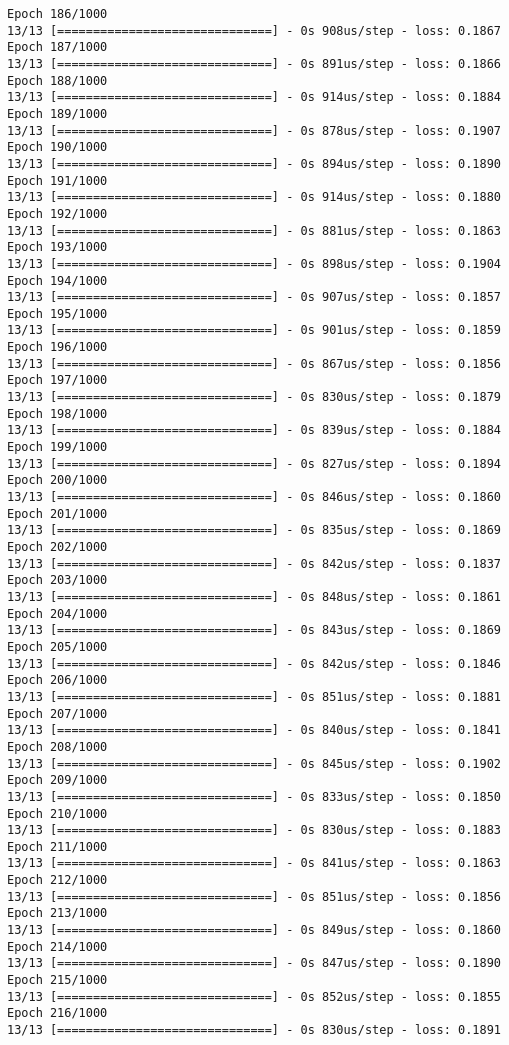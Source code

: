 \documentclass[11pt]{article}
\begin{document}
\begin{Verbatim}[commandchars=\\\{\}]
Epoch 186/1000
13/13 [==============================] - 0s 908us/step - loss: 0.1867
Epoch 187/1000
13/13 [==============================] - 0s 891us/step - loss: 0.1866
Epoch 188/1000
13/13 [==============================] - 0s 914us/step - loss: 0.1884
Epoch 189/1000
13/13 [==============================] - 0s 878us/step - loss: 0.1907
Epoch 190/1000
13/13 [==============================] - 0s 894us/step - loss: 0.1890
Epoch 191/1000
13/13 [==============================] - 0s 914us/step - loss: 0.1880
Epoch 192/1000
13/13 [==============================] - 0s 881us/step - loss: 0.1863
Epoch 193/1000
13/13 [==============================] - 0s 898us/step - loss: 0.1904
Epoch 194/1000
13/13 [==============================] - 0s 907us/step - loss: 0.1857
Epoch 195/1000
13/13 [==============================] - 0s 901us/step - loss: 0.1859
Epoch 196/1000
13/13 [==============================] - 0s 867us/step - loss: 0.1856
Epoch 197/1000
13/13 [==============================] - 0s 830us/step - loss: 0.1879
Epoch 198/1000
13/13 [==============================] - 0s 839us/step - loss: 0.1884
Epoch 199/1000
13/13 [==============================] - 0s 827us/step - loss: 0.1894
Epoch 200/1000
13/13 [==============================] - 0s 846us/step - loss: 0.1860
Epoch 201/1000
13/13 [==============================] - 0s 835us/step - loss: 0.1869
Epoch 202/1000
13/13 [==============================] - 0s 842us/step - loss: 0.1837
Epoch 203/1000
13/13 [==============================] - 0s 848us/step - loss: 0.1861
Epoch 204/1000
13/13 [==============================] - 0s 843us/step - loss: 0.1869
Epoch 205/1000
13/13 [==============================] - 0s 842us/step - loss: 0.1846
Epoch 206/1000
13/13 [==============================] - 0s 851us/step - loss: 0.1881
Epoch 207/1000
13/13 [==============================] - 0s 840us/step - loss: 0.1841
Epoch 208/1000
13/13 [==============================] - 0s 845us/step - loss: 0.1902
Epoch 209/1000
13/13 [==============================] - 0s 833us/step - loss: 0.1850
Epoch 210/1000
13/13 [==============================] - 0s 830us/step - loss: 0.1883
Epoch 211/1000
13/13 [==============================] - 0s 841us/step - loss: 0.1863
Epoch 212/1000
13/13 [==============================] - 0s 851us/step - loss: 0.1856
Epoch 213/1000
13/13 [==============================] - 0s 849us/step - loss: 0.1860
Epoch 214/1000
13/13 [==============================] - 0s 847us/step - loss: 0.1890
Epoch 215/1000
13/13 [==============================] - 0s 852us/step - loss: 0.1855
Epoch 216/1000
13/13 [==============================] - 0s 830us/step - loss: 0.1891

\end{Verbatim}
\end{document}
